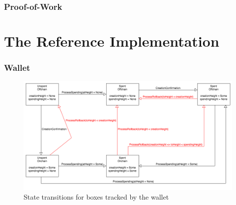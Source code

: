 \documentclass[]{article}   %
\newcommand{\authnote}[2]{\marginpar{\parbox{\marginparwidth}{\tiny %
  \textsf{#1 {\textcolor{blue}{notes: #2}}}}}%
  \textcolor{blue}{\textbf{\dag}}}
\newcommand{\authnote}[2]{
  \textsf{#1 \textcolor{blue}{: #2}}}
\newcommand{\authnote}[2]{}
\newcommand{\vnote}[1]{{\authnote{\textcolor{purple}{Vasily notes}}{#1}}}
\begin{document}
\vnote{Script needed}

\section{Proof-of-Work}

\part{The Reference Implementation}
\label{part-impl}



\section{Wallet}

\begin{figure}[H]
    \centering
    \includegraphics[width=\textwidth]{img/box-transition.png}
    \caption{State transitions for boxes tracked by the wallet
    \label{fig:emission}}
\end{figure}



\end{document}
